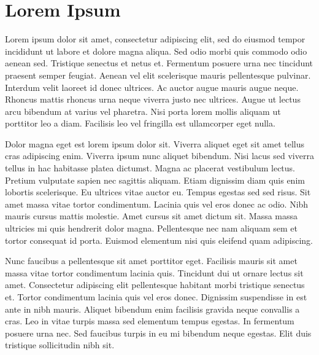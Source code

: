 \section{Lorem Ipsum}
\label{sec:lorem_ipsum}

Lorem ipsum dolor sit amet, consectetur adipiscing elit, sed do eiusmod tempor incididunt ut labore et dolore magna aliqua. Sed odio morbi quis commodo odio aenean sed. Tristique senectus et netus et. Fermentum posuere urna nec tincidunt praesent semper feugiat. Aenean vel elit scelerisque mauris pellentesque pulvinar. Interdum velit laoreet id donec ultrices. Ac auctor augue mauris augue neque. Rhoncus mattis rhoncus urna neque viverra justo nec ultrices. Augue ut lectus arcu bibendum at varius vel pharetra. Nisi porta lorem mollis aliquam ut porttitor leo a diam. Facilisis leo vel fringilla est ullamcorper eget nulla.

Dolor magna eget est lorem ipsum dolor sit. Viverra aliquet eget sit amet tellus cras adipiscing enim. Viverra ipsum nunc aliquet bibendum. Nisi lacus sed viverra tellus in hac habitasse platea dictumst. Magna ac placerat vestibulum lectus. Pretium vulputate sapien nec sagittis aliquam. Etiam dignissim diam quis enim lobortis scelerisque. Eu ultrices vitae auctor eu. Tempus egestas sed sed risus. Sit amet massa vitae tortor condimentum. Lacinia quis vel eros donec ac odio. Nibh mauris cursus mattis molestie. Amet cursus sit amet dictum sit. Massa massa ultricies mi quis hendrerit dolor magna. Pellentesque nec nam aliquam sem et tortor consequat id porta. Euismod elementum nisi quis eleifend quam adipiscing.

Nunc faucibus a pellentesque sit amet porttitor eget. Facilisis mauris sit amet massa vitae tortor condimentum lacinia quis. Tincidunt dui ut ornare lectus sit amet. Consectetur adipiscing elit pellentesque habitant morbi tristique senectus et. Tortor condimentum lacinia quis vel eros donec. Dignissim suspendisse in est ante in nibh mauris. Aliquet bibendum enim facilisis gravida neque convallis a cras. Leo in vitae turpis massa sed elementum tempus egestas. In fermentum posuere urna nec. Sed faucibus turpis in eu mi bibendum neque egestas. Elit duis tristique sollicitudin nibh sit.
\cite{loremIpsum}